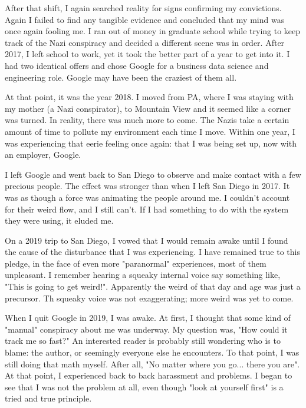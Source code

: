 \documentclass{article}
\begin{document}
\begin{multicols}{2}
After that shift, I again searched reality for signs confirming my convictions. Again I failed to find any tangible evidence and concluded that my mind was once again fooling me. I ran out of money in graduate school while trying to keep track of the Nazi conspiracy and decided a different scene was in order. After 2017, I left school to work, yet it took the better part of a year to get into it. I had two identical offers and chose Google for a business data science and engineering role. Google may have been the craziest of them all.

At that point, it was the year 2018. I moved from PA, where I was staying with my mother (a Nazi conspirator), to Mountain View and it seemed like a corner was turned. In reality, there was much more to come. The Nazis take a certain amount of time to pollute my environment each time I move. Within one year, I was experiencing that eerie feeling once again: that I was being set up, now with an employer, Google. 

I left Google and went back to San Diego to observe and make contact with a few precious people. The effect was stronger than when I left San Diego in 2017. It was as though a force was animating the people around me. I couldn't account for their weird flow, and I still can't. If I had something to do with the system they were using, it eluded me. 

On a 2019 trip to San Diego, I vowed that I would remain awake until I found the cause of the disturbance that I was experiencing. I have remained true to this pledge, in the face of even more "paranormal" experiences, most of them unpleasant. I remember hearing a squeaky internal voice say something like, "This is going to get weird!". Apparently the weird of that day and age was just a precursor. Th squeaky voice was not exaggerating; more weird was yet to come.

When I quit Google in 2019, I was awake. At first, I thought that some kind of "manual" conspiracy about me was underway. My question was, "How could it track me so fast?" An interested reader is probably still wondering who is to blame: the author, or seemingly everyone else he encounters. To that point, I was still doing that math myself. After all, "No matter where you go... there you are". At that point, I experienced back to back harassment and problems. I began to see that I was not the problem at all, even though "look at yourself first" is a tried and true principle. 


\end{multicols}
\end{document}
